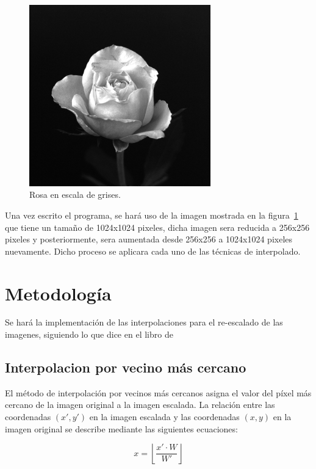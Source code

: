 \documentclass[11pt, letterpaper]{article}
\begin{document}
	\begin{figure}[h]
		\centering
		\includegraphics[width=0.7\textwidth]{IMG/Fig2.19(a).jpg}
		\caption{Rosa en escala de grises.}
		\label{fig:f1}
	\end{figure}
	
	Una vez escrito el programa, se hará uso de la imagen mostrada en la figura~\ref{fig:f1} que tiene un tamaño de 1024x1024 pixeles, dicha imagen sera reducida a 256x256 pixeles y posteriormente, sera aumentada desde 256x256 a 1024x1024 pixeles nuevamente. Dicho proceso se aplicara cada uno de las técnicas de interpolado. 
	
	
	\newpage
	
	\section{Metodología}

	Se hará la implementación de las interpolaciones para el re-escalado de las imagenes, siguiendo lo que dice en el libro de \cite{gonzalez2018digital}
	
	\subsection{Interpolacion por vecino más cercano}
	
	El método de interpolación por vecinos más cercanos asigna el valor del píxel más cercano de la imagen original a la imagen escalada. La relación entre las coordenadas \( (x', y') \) en la imagen escalada y las coordenadas \( (x, y) \) en la imagen original se describe mediante las siguientes ecuaciones:
	
	\begin{equation}
		x = \left\lfloor \frac{x' \cdot W}{W'} \right\rfloor
	\end{equation}
	
\end{document}
